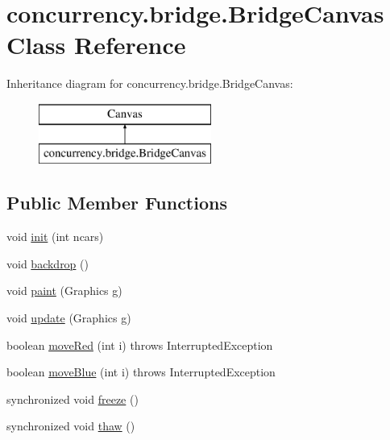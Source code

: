 \hypertarget{classconcurrency_1_1bridge_1_1_bridge_canvas}{}\section{concurrency.\+bridge.\+Bridge\+Canvas Class Reference}
\label{classconcurrency_1_1bridge_1_1_bridge_canvas}
Inheritance diagram for concurrency.\+bridge.\+Bridge\+Canvas\+:\begin{figure}[H]
\begin{center}
\leavevmode
\includegraphics[height=2.000000cm]{classconcurrency_1_1bridge_1_1_bridge_canvas}
\end{center}
\end{figure}
\subsection*{Public Member Functions}
\begin{DoxyCompactItemize}
\item 
void \mbox{\hyperlink{classconcurrency_1_1bridge_1_1_bridge_canvas_abe6fd58a5a831f80fd3716103cc12672}{init}} (int ncars)
\item 
void \mbox{\hyperlink{classconcurrency_1_1bridge_1_1_bridge_canvas_a9839d0c214779138f97f4aaf972991c3}{backdrop}} ()
\item 
void \mbox{\hyperlink{classconcurrency_1_1bridge_1_1_bridge_canvas_a9b8e8df5174b22c0ebf8096e651a4440}{paint}} (Graphics g)
\item 
void \mbox{\hyperlink{classconcurrency_1_1bridge_1_1_bridge_canvas_a3cdc761a16dc589c729d515abbd772b9}{update}} (Graphics g)
\item 
boolean \mbox{\hyperlink{classconcurrency_1_1bridge_1_1_bridge_canvas_a166d001c782d362f3a8aca27e493a074}{move\+Red}} (int i)  throws Interrupted\+Exception
\item 
boolean \mbox{\hyperlink{classconcurrency_1_1bridge_1_1_bridge_canvas_aef8d7c1ca31663c9ba3ec0fdebfc4b73}{move\+Blue}} (int i)  throws Interrupted\+Exception
\item 
synchronized void \mbox{\hyperlink{classconcurrency_1_1bridge_1_1_bridge_canvas_a777eb5e18c6ee3a77ef029230101f2d1}{freeze}} ()
\item 
synchronized void \mbox{\hyperlink{classconcurrency_1_1bridge_1_1_bridge_canvas_af3ce80d4ece527c54b0e7eb74ce75af4}{thaw}} ()
\end{DoxyCompactItemize}
